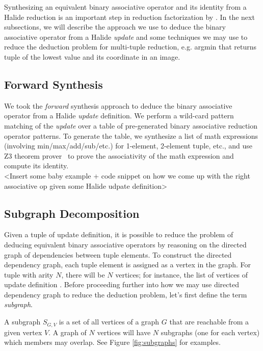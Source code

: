 Synthesizing an equivalent binary associative operator and its identity from a Halide reduction is an important step in reduction factorization by . In the next subsections, we will describe the approach we use to deduce the binary associative operator from a Halide \emph{update} and some techniques we may use to reduce the deduction problem for multi-tuple reduction, e.g. argmin that returns tuple of the lowest value and its coordinate in an image.

\subsection{Forward Synthesis}

We took the \emph{forward} synthesis approach to deduce the binary associative operator from a Halide \emph{update} definition. We perform a wild-card pattern matching of the \emph{update} over a table of pre-generated binary associative reduction operator patterns. To generate the table, we synthesize a list of math expressions (involving min/max/add/sub/etc.) for 1-element, 2-element tuple, etc., and use Z3 theorem prover~\cite{DeMoura:2008:ZES:1792734.1792766} to prove the associativity of the math expression and compute its identity. \\

<Insert some baby example + code snippet on how we come up with the right associative op given some Halide udpate definition> \\

\subsection{Subgraph Decomposition}

Given a tuple of update definition, it is possible to reduce the problem of deducing equivalent binary associative operators by reasoning on the directed graph of dependencies between tuple elements. To construct the directed dependency graph, each tuple element is assigned as a vertex in the graph. For tuple with arity $N$, there will be $N$ vertices; for instance, the list of vertices of update definition . Before proceeding further into how we may use directed dependency graph to reduce the deduction problem, let's first define the term \emph{subgraph}. 

\begin{definition}
A subgraph $S_{G,V}$ is a set of all vertices of a graph $G$ that are reachable from a given vertex $V$. A graph of $N$ vertices will have $N$ subgraphs (one for each vertex) which members may overlap. See Figure \ref{fig:subgraphs} for examples. 
\end{definition}

